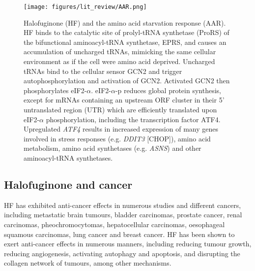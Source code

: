 \begin{figure}[htb]
\centering
\texttt{[image: figures/lit\_review/AAR.png]}
\caption[Halofuginone and the amino acid starvation response]{Halofuginone (HF) and the amino acid starvation response (AAR).
HF binds to the catalytic site of prolyl-tRNA synthetase (ProRS) of the bifunctional aminoacyl-tRNA synthetase, EPRS, and causes an accumulation of uncharged tRNAs, mimicking the same cellular environment as if the cell were amino acid deprived.
Uncharged tRNAs bind to the cellular sensor GCN2 and trigger autophosphorylation and activation of GCN2.
Activated GCN2 then phosphorylates eIF2-$\alpha$.
eIF2-$\alpha$-p reduces global protein synthesis, except for mRNAs containing an upstream ORF cluster in their 5' untranslated region (UTR) which are efficiently translated upon eIF2-$\alpha$ phosphorylation\cite{ye2015gcn2}, including the transcription factor ATF4.
Upregulated \textit{ATF4} results in increased expression of many genes involved in stress responses (e.g. \textit{DDIT3} [CHOP]), amino acid metabolism, amino acid synthetases (e.g. \textit{ASNS}) and other aminoacyl-tRNA synthetases.
}
\label{fig:HF_AAR}\end{figure}


\subsection{Halofuginone and cancer}\label{sec:HF_cancer}

HF has exhibited anti-cancer effects in numerous studies and different cancers, including metastatic brain tumours, bladder carcinomas, prostate cancer, renal carcinomas, pheochromocytomas, hepatocellular carcinomas, oesophageal squamous carcinomas, lung cancer and breast cancer\cite{abramovitch2004halofuginone, elkin1999inhibition, gavish2002growth, genin2008myofibroblasts, gross2003treatment, nagler2004suppression, wang2020significance, demiroglu2020anticarcinogenic, xia2018halofuginone}.
HF has been shown to exert anti-cancer effects in numerous manners, including reducing tumour growth, reducing angiogenesis, activating autophagy and apoptosis, and disrupting the collagen network of tumours, among other mechanisms.

